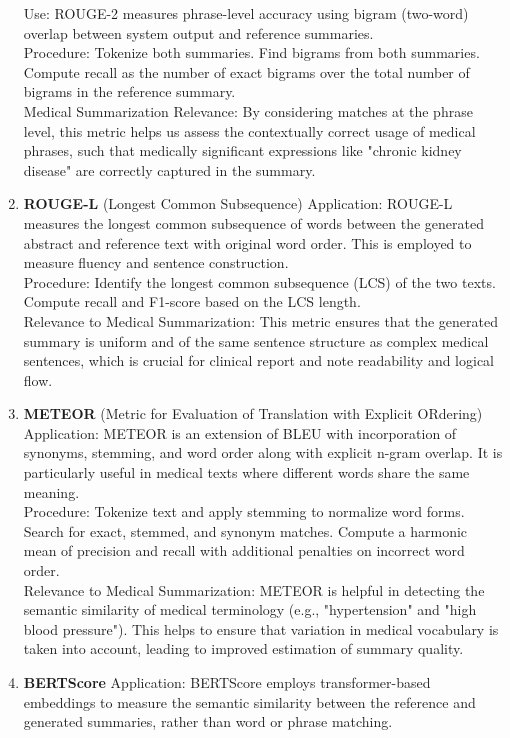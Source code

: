 \begin{enumerate}
Use: ROUGE-2 measures phrase-level accuracy using bigram (two-word) overlap between system output and reference summaries.
\\
Procedure:
Tokenize both summaries.
Find bigrams from both summaries.
Compute recall as the number of exact bigrams over the total number of bigrams in the reference summary.
\\
Medical Summarization Relevance: By considering matches at the phrase level, this metric helps us assess the contextually correct usage of medical phrases, such that medically significant expressions like "chronic kidney disease" are correctly captured in the summary.
\\
    \item \textbf{ROUGE-L} (Longest Common Subsequence)
Application: ROUGE-L measures the longest common subsequence of words between the generated abstract and reference text with original word order. This is employed to measure fluency and sentence construction.
\\
Procedure:
Identify the longest common subsequence (LCS) of the two texts.
Compute recall and F1-score based on the LCS length.
\\
Relevance to Medical Summarization: This metric ensures that the generated summary is uniform and of the same sentence structure as complex medical sentences, which is crucial for clinical report and note readability and logical flow.
\\
    \item \textbf{METEOR} (Metric for Evaluation of Translation with Explicit ORdering)
Application: METEOR is an extension of BLEU with incorporation of synonyms, stemming, and word order along with explicit n-gram overlap. It is particularly useful in medical texts where different words share the same meaning.
\\
Procedure:
Tokenize text and apply stemming to normalize word forms.
Search for exact, stemmed, and synonym matches.
Compute a harmonic mean of precision and recall with additional penalties on incorrect word order.
\\
Relevance to Medical Summarization: METEOR is helpful in detecting the semantic similarity of medical terminology (e.g., "hypertension" and "high blood pressure"). This helps to ensure that variation in medical vocabulary is taken into account, leading to improved estimation of summary quality.
\\
    \item \textbf{BERTScore}
Application: BERTScore employs transformer-based embeddings to measure the semantic similarity between the reference and generated summaries, rather than word or phrase matching.

\end{enumerate}
